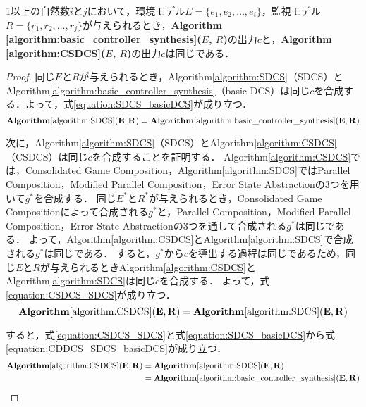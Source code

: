 \begin{pro}
    \label{prf:proof1}
    1以上の自然数$i$と$j$において，環境モデル$E = \{e_1, e_2, \ldots, e_i\}$，監視モデル$R = \{r_1, r_2, \ldots, r_j\}$が与えられるとき，{\bf Algorithm \ref{algorithm:basic_controller_synthesis}($E$, $R$)}の出力$c$と，{\bf Algorithm \ref{algorithm:CSDCS}($E$, $R$)}の出力$c$は同じである．
\end{pro}
\begin{proof}
    同じ$E$と$R$が与えられるとき，Algorithm\ref{algorithm:SDCS}（SDCS）とAlgorithm\ref{algorithm:basic_controller_synthesis}（basic DCS）は同じ$c$を合成する\cite{yamauchi:IEICEJ2023}．よって，式\ref{equation:SDCS_basicDCS}が成り立つ．
    \begin{equation}
    \label{equation:SDCS_basicDCS}
        {\bf Algorithm \ref{algorithm:SDCS}(E, R)} = {\bf Algorithm \ref{algorithm:basic_controller_synthesis}(E, R)}
    \end{equation}

    次に，Algorithm\ref{algorithm:SDCS}（SDCS）とAlgorithm\ref{algorithm:CSDCS}（CSDCS）は同じ$c$を合成することを証明する．
    Algorithm\ref{algorithm:CSDCS}では，Consolidated Game Composition，Algorithm\ref{algorithm:SDCS}ではParallel Composition，Modified Parallel Composition，Error State Abstractionの3つを用いて$g^*$を合成する．
    同じ$E^*$と$R^*$が与えられるとき，Consolidated Game Compositionによって合成される$g^*$と，Parallel Composition，Modified Parallel Composition，Error State Abstractionの3つを通して合成される$g^*$は同じである\cite{yamauchi:IPSJ2024}．
    よって，Algorithm\ref{algorithm:CSDCS}とAlgorithm\ref{algorithm:SDCS}で合成される$g^*$は同じである．
    すると，$g^*$から$c$を導出する過程は同じであるため，同じ$E$と$R$が与えられるときAlgorithm\ref{algorithm:CSDCS}とAlgorithm\ref{algorithm:SDCS}は同じ$c$を合成する．
    よって，式\ref{equation:CSDCS_SDCS}が成り立つ．
    \begin{equation}
    \label{equation:CSDCS_SDCS}
        {\bf Algorithm \ref{algorithm:CSDCS}(E, R)} = {\bf Algorithm \ref{algorithm:SDCS}(E, R)}
    \end{equation}

    すると，式\ref{equation:CSDCS_SDCS}と式\ref{equation:SDCS_basicDCS}から式\ref{equation:CDDCS_SDCS_basicDCS}が成り立つ．
    \begin{align}
    \label{equation:CDDCS_SDCS_basicDCS}
        \begin{split}
            {\bf Algorithm \ref{algorithm:CSDCS}(E, R)} &= {\bf Algorithm \ref{algorithm:SDCS}(E, R)}\\
            &= {\bf Algorithm \ref{algorithm:basic_controller_synthesis}(E, R)}
        \end{split}
    \end{align}


\end{proof}
